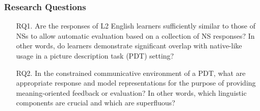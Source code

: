 \documentclass[handout,xcolor={dvipsnames}]{beamer}
\begin{document}
%
%



\begin{frame}
\frametitle{Research Questions}
\small
\pause
\begin{itemize}
\pause
\vspace{2em}
\item[RQ1.]{Are the responses of L2 English learners sufficiently similar to those of NSs to allow automatic evaluation based on a collection of NS responses? In other words, do learners demonstrate significant overlap with native-like usage in a picture description task (PDT) setting?} %
\vspace{2em}
\pause
\item[RQ2.]{In the constrained communicative environment of a PDT, what are appropriate response and model representations for the purpose of providing meaning-oriented feedback or evaluation? In other words, which linguistic components are crucial and which are superfluous?}


\end{itemize}
\end{frame}
\end{document}
